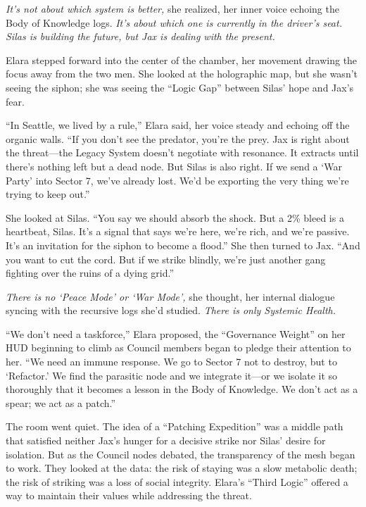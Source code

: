 \textit{It's not about which system is better,} she realized, her inner voice echoing the Body of Knowledge logs. \textit{It's about which one is currently in the driver's seat. Silas is building the future, but Jax is dealing with the present.}


Elara stepped forward into the center of the chamber, her movement drawing the focus away from the two men. She looked at the holographic map, but she wasn't seeing the siphon; she was seeing the ``Logic Gap'' between Silas' hope and Jax's fear.

``In Seattle, we lived by a rule,'' Elara said, her voice steady and echoing off the organic walls. ``If you don't see the predator, you're the prey. Jax is right about the threat—the Legacy System doesn't negotiate with resonance. It extracts until there's nothing left but a dead node. But Silas is also right. If we send a `War Party' into Sector 7, we've already lost. We'd be exporting the very thing we're trying to keep out.''

She looked at Silas. ``You say we should absorb the shock. But a 2\% bleed is a heartbeat, Silas. It's a signal that says we're here, we're rich, and we're passive. It's an invitation for the siphon to become a flood.'' She then turned to Jax. ``And you want to cut the cord. But if we strike blindly, we're just another gang fighting over the ruins of a dying grid.''

\textit{There is no `Peace Mode' or `War Mode',} she thought, her internal dialogue syncing with the recursive logs she'd studied. \textit{There is only Systemic Health.}

``We don't need a taskforce,'' Elara proposed, the ``Governance Weight'' on her HUD beginning to climb as Council members began to pledge their attention to her. ``We need an immune response. We go to Sector 7 not to destroy, but to `Refactor.' We find the parasitic node and we integrate it—or we isolate it so thoroughly that it becomes a lesson in the Body of Knowledge. We don't act as a spear; we act as a patch.''


The room went quiet. The idea of a ``Patching Expedition'' was a middle path that satisfied neither Jax's hunger for a decisive strike nor Silas' desire for isolation. But as the Council nodes debated, the transparency of the mesh began to work. They looked at the data: the risk of staying was a slow metabolic death; the risk of striking was a loss of social integrity. Elara's ``Third Logic'' offered a way to maintain their values while addressing the threat.

